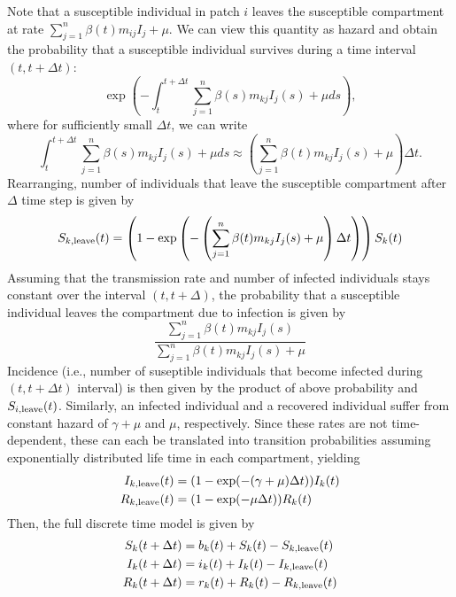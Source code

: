 \documentclass[12pt]{article}\usepackage[]{graphicx}\usepackage[]{color}
\begin{document}
Note that a susceptible individual in patch $i$ leaves the susceptible compartment at rate $\sum_{j=1}^n \beta(t) m_{ij} I_j + \mu$. We can view this quantity as hazard and obtain the probability that a susceptible individual survives during a time interval $(t, t + \Delta t)$:
\begin{equation}
\exp \left(-\int_{t}^{t + \Delta t} \sum_{j=1}^n \beta(s) m_{kj} I_j(s) + \mu d s \right),
\end{equation}
where for sufficiently small $\Delta t$, we can write
\begin{equation}
\int_{t}^{t + \Delta t} \sum_{j=1}^n \beta(s) m_{kj} I_j(s) + \mu d s \approx \left(\sum_{j=1}^n \beta(t) m_{kj} I_j(s) + \mu \right) \Delta t.
\end{equation}
Rearranging, number of individuals that leave the susceptible compartment after $\Delta$ time step is given by
\begin{equation}
S_{k, \tiny{\textrm{leave}}}(t) = \left(1 - \exp \left(-\left(\sum_{j=1}^n \beta(t) m_{kj} I_j(s) + \mu \right) \Delta t \right) \right) S_k(t)
\end{equation}
Assuming that the transmission rate and number of infected individuals stays constant over the interval $(t, t+\Delta)$, the probability that a susceptible individual leaves the compartment due to infection is given by 
\begin{equation}
\frac{\sum_{j=1}^n \beta(t) m_{kj} I_j(s)}{\sum_{j=1}^n \beta(t) m_{kj} I_j(s) + \mu}
\end{equation}
Incidence (i.e., number of suseptible individuals that become infected during $(t, t+\Delta t)$ interval) is then given by the product of above probability and $S_{i, \tiny{\textrm{leave}}}(t)$.
Similarly, an infected individual and a recovered individual suffer from constant hazard of $\gamma + \mu$ and $\mu$, respectively.
Since these rates are not time-dependent, these can each be translated into transition probabilities assuming exponentially distributed life time in each compartment, yielding
\begin{equation}
\begin{aligned}
I_{k, \tiny{\textrm{leave}}}(t) &= (1 - \exp(-(\gamma + \mu)\Delta t)) I_k(t) \\
R_{k, \tiny{\textrm{leave}}}(t) &= (1 - \exp(-\mu \Delta t)) R_k(t)
\end{aligned}
\end{equation}
Then, the full discrete time model is given by
\begin{equation}
\label{eq:discretedeterministic}
\begin{aligned}
S_{k}(t+\Delta t) &= b_k(t) + S_k(t) - S_{k, \tiny{\textrm{leave}}}(t)\\
I_{k}(t+\Delta t) &= i_k(t) + I_k(t) - I_{k, \tiny{\textrm{leave}}}(t)\\
R_{k}(t+\Delta t) &= r_k(t) + R_k(t) - R_{k, \tiny{\textrm{leave}}}(t)
\end{aligned}
\end{equation}
\end{document}
